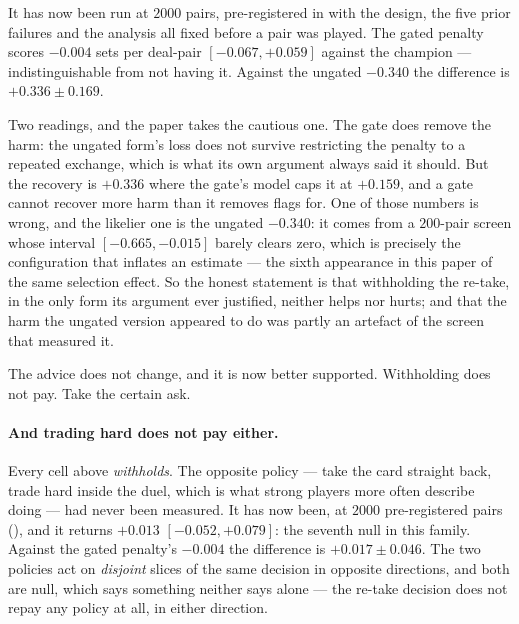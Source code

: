 \documentclass[11pt,a4paper]{article}
\begin{document}
It has now been run at $2000$ pairs, pre-registered in
 with the design, the five prior
failures and the analysis all fixed before a pair was played. The gated penalty
scores $\mathbf{-0.004}$ sets per deal-pair $[-0.067, +0.059]$ against the
champion --- indistinguishable from not having it. Against the ungated
$-0.340$ the difference is $+0.336 \pm 0.169$.

Two readings, and the paper takes the cautious one. The gate does remove the
harm: the ungated form's loss does not survive restricting the penalty to a
repeated exchange, which is what its own argument always said it should. But
the recovery is $+0.336$ where the gate's model caps it at $+0.159$, and a gate
cannot recover more harm than it removes flags for. One of those numbers is
wrong, and the likelier one is the ungated $-0.340$: it comes from a $200$-pair
screen whose interval $[-0.665, -0.015]$ barely clears zero, which is precisely
the configuration that inflates an estimate --- the sixth appearance in this
paper of the same selection effect. So the honest statement is that withholding
the re-take, in the only form its argument ever justified, neither helps nor
hurts; and that the harm the ungated version appeared to do was partly an
artefact of the screen that measured it.

The advice does not change, and it is now better supported. Withholding does
not pay. Take the certain ask.

\paragraph{And trading hard does not pay either.} Every cell above
\emph{withholds}. The opposite policy --- take the card straight back, trade
hard inside the duel, which is what strong players more often describe doing
--- had never been measured. It has now been, at $2000$ pre-registered pairs
(), and it returns
$\mathbf{+0.013}$ $[-0.052, +0.079]$: the seventh null in this family. Against
the gated penalty's $-0.004$ the difference is $+0.017 \pm 0.046$. The two
policies act on \emph{disjoint} slices of the same decision in opposite
directions, and both are null, which says something neither says alone --- the
re-take decision does not repay any policy at all, in either direction.
\end{document}
